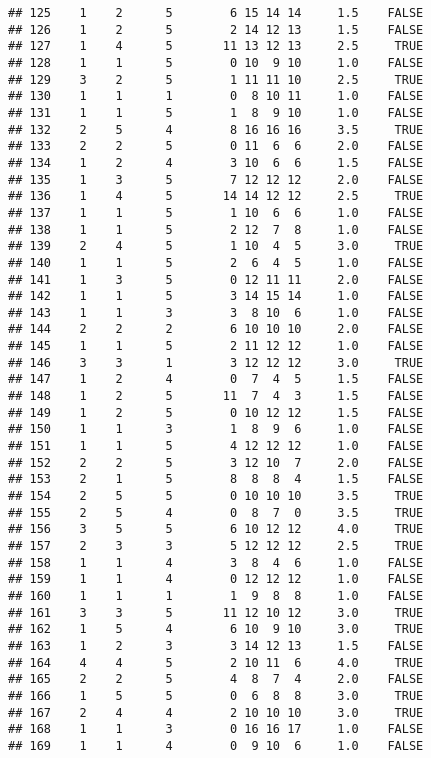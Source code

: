 \documentclass[]{article}
\begin{document}
\begin{verbatim}
## 125    1    2      5        6 15 14 14     1.5    FALSE
## 126    1    2      5        2 14 12 13     1.5    FALSE
## 127    1    4      5       11 13 12 13     2.5     TRUE
## 128    1    1      5        0 10  9 10     1.0    FALSE
## 129    3    2      5        1 11 11 10     2.5     TRUE
## 130    1    1      1        0  8 10 11     1.0    FALSE
## 131    1    1      5        1  8  9 10     1.0    FALSE
## 132    2    5      4        8 16 16 16     3.5     TRUE
## 133    2    2      5        0 11  6  6     2.0    FALSE
## 134    1    2      4        3 10  6  6     1.5    FALSE
## 135    1    3      5        7 12 12 12     2.0    FALSE
## 136    1    4      5       14 14 12 12     2.5     TRUE
## 137    1    1      5        1 10  6  6     1.0    FALSE
## 138    1    1      5        2 12  7  8     1.0    FALSE
## 139    2    4      5        1 10  4  5     3.0     TRUE
## 140    1    1      5        2  6  4  5     1.0    FALSE
## 141    1    3      5        0 12 11 11     2.0    FALSE
## 142    1    1      5        3 14 15 14     1.0    FALSE
## 143    1    1      3        3  8 10  6     1.0    FALSE
## 144    2    2      2        6 10 10 10     2.0    FALSE
## 145    1    1      5        2 11 12 12     1.0    FALSE
## 146    3    3      1        3 12 12 12     3.0     TRUE
## 147    1    2      4        0  7  4  5     1.5    FALSE
## 148    1    2      5       11  7  4  3     1.5    FALSE
## 149    1    2      5        0 10 12 12     1.5    FALSE
## 150    1    1      3        1  8  9  6     1.0    FALSE
## 151    1    1      5        4 12 12 12     1.0    FALSE
## 152    2    2      5        3 12 10  7     2.0    FALSE
## 153    2    1      5        8  8  8  4     1.5    FALSE
## 154    2    5      5        0 10 10 10     3.5     TRUE
## 155    2    5      4        0  8  7  0     3.5     TRUE
## 156    3    5      5        6 10 12 12     4.0     TRUE
## 157    2    3      3        5 12 12 12     2.5     TRUE
## 158    1    1      4        3  8  4  6     1.0    FALSE
## 159    1    1      4        0 12 12 12     1.0    FALSE
## 160    1    1      1        1  9  8  8     1.0    FALSE
## 161    3    3      5       11 12 10 12     3.0     TRUE
## 162    1    5      4        6 10  9 10     3.0     TRUE
## 163    1    2      3        3 14 12 13     1.5    FALSE
## 164    4    4      5        2 10 11  6     4.0     TRUE
## 165    2    2      5        4  8  7  4     2.0    FALSE
## 166    1    5      5        0  6  8  8     3.0     TRUE
## 167    2    4      4        2 10 10 10     3.0     TRUE
## 168    1    1      3        0 16 16 17     1.0    FALSE
## 169    1    1      4        0  9 10  6     1.0    FALSE

\end{verbatim}
\end{document}
